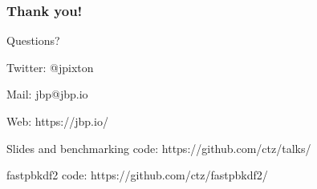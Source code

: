\documentclass[aspectratio=169]{beamer}
\begin{document}
\frame
{
  \frametitle{Thank you!}
  Questions?

  \vspace{5em}

  Twitter: @jpixton

  Mail: jbp@jbp.io

  Web: https://jbp.io/

  Slides and benchmarking code: https://github.com/ctz/talks/

  fastpbkdf2 code: https://github.com/ctz/fastpbkdf2/
}
\end{document}
